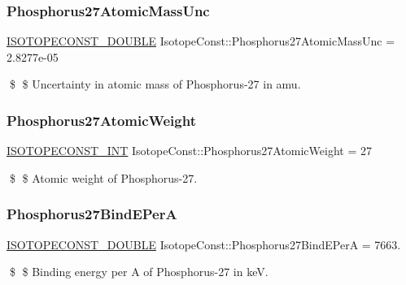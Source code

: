 \subsubsection{\texorpdfstring{Phosphorus27\+Atomic\+Mass\+Unc}{Phosphorus27AtomicMassUnc}}
{\footnotesize\ttfamily \mbox{\hyperlink{group___isotope_const-_macros_ga8f45a7272ce02c0b4c65c44636ed719a}{I\+S\+O\+T\+O\+P\+E\+C\+O\+N\+S\+T\+\_\+\+D\+O\+U\+B\+LE}} Isotope\+Const\+::\+Phosphorus27\+Atomic\+Mass\+Unc = 2.\+8277e-\/05}

\$ \$ Uncertainty in atomic mass of Phosphorus-\/27 in amu. \mbox{\label{group___isotope_const-_phosphorus-_p27_gabecb6aac42658285f58592f20b14aeb1}} 
\subsubsection{\texorpdfstring{Phosphorus27\+Atomic\+Weight}{Phosphorus27AtomicWeight}}
{\footnotesize\ttfamily \mbox{\hyperlink{group___isotope_const-_macros_ga5f18360b3e99483a35c32d789e62621c}{I\+S\+O\+T\+O\+P\+E\+C\+O\+N\+S\+T\+\_\+\+I\+NT}} Isotope\+Const\+::\+Phosphorus27\+Atomic\+Weight = 27}

\$ \$ Atomic weight of Phosphorus-\/27. \mbox{\label{group___isotope_const-_phosphorus-_p27_ga1339ee911e9d0b623e26699d4e8e0e53}} 
\subsubsection{\texorpdfstring{Phosphorus27\+Bind\+E\+PerA}{Phosphorus27BindEPerA}}
{\footnotesize\ttfamily \mbox{\hyperlink{group___isotope_const-_macros_ga8f45a7272ce02c0b4c65c44636ed719a}{I\+S\+O\+T\+O\+P\+E\+C\+O\+N\+S\+T\+\_\+\+D\+O\+U\+B\+LE}} Isotope\+Const\+::\+Phosphorus27\+Bind\+E\+PerA = 7663.}

\$ \$ Binding energy per A of Phosphorus-\/27 in keV. \mbox{\label{group___isotope_const-_phosphorus-_p27_ga99c9603c1d4d71764f1339c8f8766e17}} 
